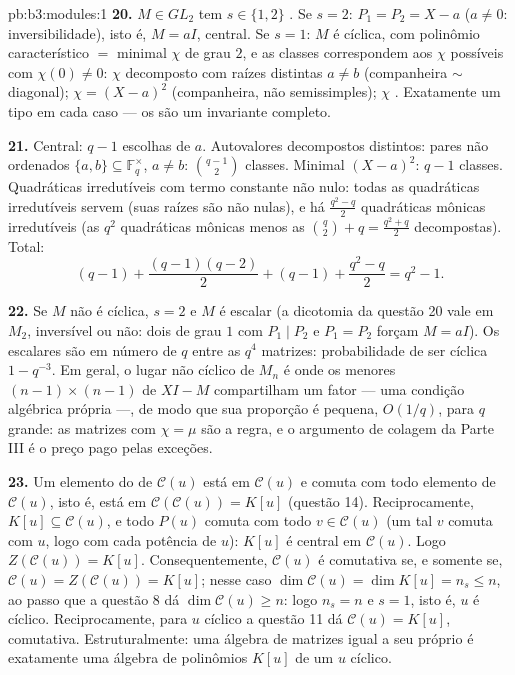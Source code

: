 \begin{solution}{pb:b3:modules:1}
\textbf{20.} $M \in GL_2$ tem $s \in \{1, 2\}$ . Se $s = 2$: $P_1 = P_2 = X - a$
($a \neq 0$: inversibilidade), isto é, $M = aI$, central. Se $s = 1$:
$M$ é cíclica, com polinômio característico $=$ minimal
$\chi$ de grau $2$, e as classes correspondem aos $\chi$
possíveis com $\chi(0) \neq 0$: $\chi$ decomposto com raízes distintas $a \neq
b$
(companheira $\sim$ diagonal); $\chi = (X - a)^2$ (companheira, não semissimples);
$\chi$ . Exatamente um tipo em cada caso --- os  são um invariante completo.

\textbf{21.} Central: $q - 1$ escolhas de $a$. Autovalores
decompostos distintos: pares não ordenados $\{a, b\} \subseteq
\mathbb F_q^\times$, $a \neq b$: $\binom{q-1}2$ classes.
Minimal $(X-a)^2$: $q - 1$ classes. Quadráticas irredutíveis com termo
constante não nulo: todas as quadráticas irredutíveis servem (suas
raízes são não nulas), e há $\frac{q^2 - q}2$ quadráticas mônicas irredutíveis (as
$q^2$ quadráticas mônicas menos as $\binom q2 + q = \frac{q^2+q}2$ decompostas). Total:
\[
(q - 1) + \frac{(q-1)(q-2)}2 + (q - 1) + \frac{q^2 - q}2
= q^2 - 1 .
\]

\textbf{22.} Se $M$ não é cíclica, $s = 2$ e $M$ é escalar (a
dicotomia da questão 20 vale em $M_2$, inversível ou não: dois
 de grau $1$ com $P_1 \mid P_2$ e $P_1 =
P_2$ forçam $M = aI$).
Os escalares são em número de $q$ entre as $q^4$ matrizes:
probabilidade de ser cíclica $1 - q^{-3}$. Em geral, o lugar não cíclico de
$M_n$ é onde os menores $(n-1)\times(n-1)$ de $XI - M$ compartilham um fator
--- uma condição algébrica própria ---, de modo que sua proporção é
pequena, $O(1/q)$, para $q$ grande: as matrizes com $\chi = \mu$ são a
regra, e o argumento de colagem da Parte III é o preço pago pelas
exceções.

\textbf{23.} Um elemento do  de $\mathcal C(u)$ está em $\mathcal C(u)$ e comuta com
todo elemento de $\mathcal C(u)$, isto é, está em $\mathcal C(\mathcal C(u)) =
K[u]$ (questão 14).
Reciprocamente, $K[u] \subseteq \mathcal C(u)$, e todo $P(u)$ comuta com todo $v \in \mathcal C(u)$ (um tal
$v$ comuta com $u$, logo com cada potência de $u$):
$K[u]$ é central em $\mathcal C(u)$. Logo $Z(\mathcal C(u))
= K[u]$. Consequentemente, $\mathcal C(u)$ é
comutativa se, e somente se, $\mathcal C(u) = Z(\mathcal C(u)) = K[u]$; nesse caso $\dim\mathcal C(u) = \dim K[u] = n_s \leq n$, ao passo que a
questão 8 dá $\dim\mathcal C(u) \geq n$: logo $n_s = n$ e $s = 1$, isto é, $u$ é cíclico.
Reciprocamente, para $u$ cíclico a questão 11 dá $\mathcal C(u) = K[u]$, comutativa.
Estruturalmente: uma álgebra de matrizes igual a seu próprio  é
exatamente uma álgebra de polinômios $K[u]$ de um $u$ cíclico.


\end{solution}
